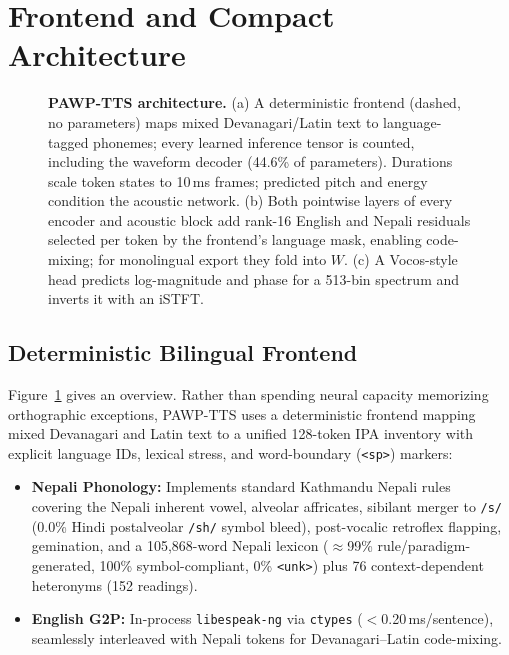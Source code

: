 \section{Frontend and Compact Architecture}
\label{sec:arch}

\begin{figure}[t]
  \centering
  \resizebox{\textwidth}{!}{}
  \caption{\textbf{PAWP-TTS architecture.} (a) A deterministic frontend (dashed, no parameters) maps mixed Devanagari/Latin text to language-tagged phonemes; every learned inference tensor is counted, including the waveform decoder (44.6\% of parameters). Durations scale token states to 10\,ms frames; predicted pitch and energy condition the acoustic network. (b) Both pointwise layers of every encoder and acoustic block add rank-16 English and Nepali residuals selected per token by the frontend's language mask, enabling code-mixing; for monolingual export they fold into $W$. (c) A Vocos-style head predicts log-magnitude and phase for a 513-bin spectrum and inverts it with an iSTFT.}
  \label{fig:arch}
\end{figure}

\subsection{Deterministic Bilingual Frontend}
Figure~\ref{fig:arch} gives an overview. Rather than spending neural capacity memorizing orthographic exceptions, PAWP-TTS uses a deterministic frontend mapping mixed Devanagari and Latin text to a unified 128-token IPA inventory with explicit language IDs, lexical stress, and word-boundary (\texttt{<sp>}) markers:
\begin{itemize}
  \item \textbf{Nepali Phonology:} Implements standard Kathmandu Nepali rules~\cite{khatiwada2009nepali} covering the Nepali inherent vowel, alveolar affricates, sibilant merger to \texttt{/s/} (0.0\% Hindi postalveolar \texttt{/sh/} symbol bleed), post-vocalic retroflex flapping, gemination, and a 105,868-word Nepali lexicon ($\approx$99\% rule/paradigm-generated, 100\% symbol-compliant, 0\% \texttt{<unk>}) plus 76 context-dependent heteronyms (152 readings).
  \item \textbf{English G2P:} In-process \texttt{libespeak-ng} via \texttt{ctypes} ($<$0.20\,ms/sentence), seamlessly interleaved with Nepali tokens for Devanagari--Latin code-mixing.
\end{itemize}

